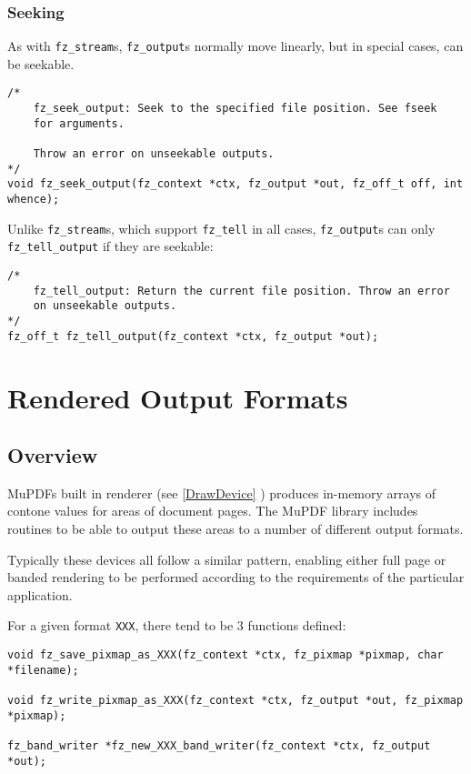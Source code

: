 \documentclass[oneside]{book}
\newcommand{\rjwref}[1] {\autoref{#1} \nameref{#1}}
\begin{document}
\subsection{Seeking}

As with \texttt{fz\_stream}s, \texttt{fz\_output}s normally move linearly, but in special cases, can be seekable.

\begin{lstlisting}
/*
	fz_seek_output: Seek to the specified file position. See fseek
	for arguments.
	
	Throw an error on unseekable outputs.
*/
void fz_seek_output(fz_context *ctx, fz_output *out, fz_off_t off, int whence);
\end{lstlisting}

Unlike \texttt{fz\_stream}s, which support \texttt{fz\_tell} in all cases, \texttt{fz\_output}s can only \texttt{fz\_tell\_output} if they are seekable:

\begin{lstlisting}
/*
	fz_tell_output: Return the current file position. Throw an error
	on unseekable outputs.
*/
fz_off_t fz_tell_output(fz_context *ctx, fz_output *out);
\end{lstlisting}

\chapter{Rendered Output Formats}
\label{OutputFormats}

\section{Overview}

MuPDFs built in renderer (see \rjwref{DrawDevice}) produces in-memory arrays of contone values for areas of document pages. The MuPDF library includes routines to be able to output these areas to a number of different output formats.

Typically these devices all follow a similar pattern, enabling either full page or banded rendering to be performed according to the requirements of the particular application.

For a given format \texttt{XXX}, there tend to be 3 functions defined:

\begin{lstlisting}
void fz_save_pixmap_as_XXX(fz_context *ctx, fz_pixmap *pixmap, char *filename);

void fz_write_pixmap_as_XXX(fz_context *ctx, fz_output *out, fz_pixmap *pixmap);

fz_band_writer *fz_new_XXX_band_writer(fz_context *ctx, fz_output *out);
\end{lstlisting}
\end{document}
